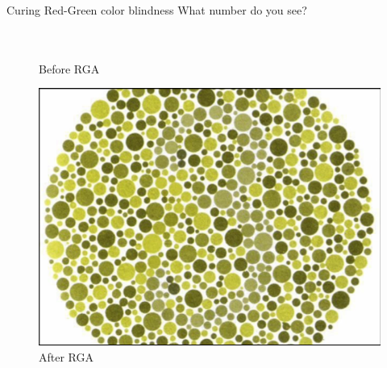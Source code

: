 \documentclass{beamer}
\begin{document}
\begin{frame}{Curing Red-Green color blindness}
What number do you see?
~\\~
\begin{figure}[ht]
   \begin{minipage}[b]{0.45\linewidth}
      \centering
      \\ Before RGA
   \end{minipage}
   \hspace{0.5cm}
   \begin{minipage}[b]{0.45\linewidth}
      \centering
      \includegraphics[width=\textwidth]{figures/RGAafter.png}
      \\ After RGA
   \end{minipage}
\end{figure}
\end{frame}
\end{document}
